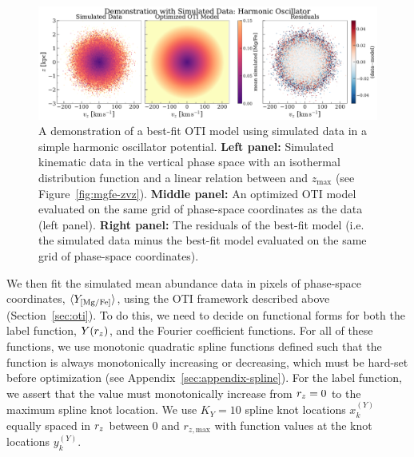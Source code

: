 \begin{figure}[t!]
\begin{center}
\includegraphics[width=\textwidth]{sho-data-model.pdf}
\end{center}
\caption{%
A demonstration of a best-fit OTI model using simulated data in a simple harmonic
oscillator potential.
\textbf{Left panel:} Simulated kinematic data in the vertical phase space with an
isothermal distribution function and a linear relation between  and
$z_{\textrm{max}}$ (see Figure~\ref{fig:mgfe-zvz}).
\textbf{Middle panel:} An optimized OTI model evaluated on the same grid of phase-space
coordinates as the data (left panel).
\textbf{Right panel:} The residuals of the best-fit model (i.e. the simulated data minus
the best-fit model evaluated on the same grid of phase-space coordinates).
\label{fig:sho-data-model}
}
\end{figure}

We then fit the simulated mean abundance data in pixels of phase-space coordinates,
$\langle Y_{{[\mathrm{Mg}/\mathrm{Fe}]}} \rangle$, using the OTI framework described above
(Section~\ref{sec:oti}).
To do this, we need to decide on functional forms for both the label function, $Y(r_z)$,
and the Fourier coefficient functions.
For all of these functions, we use monotonic quadratic spline functions defined such
that the function is always monotonically increasing or decreasing, which must be
hard-set before optimization (see Appendix~\ref{sec:appendix-spline}).
For the label function, we assert that the value must monotonically increase from $r_z =
0$ to the maximum spline knot location.
We use $K_Y=10$ spline knot locations $x_k^{(Y)}$ equally spaced in $r_z$ between $0$
and $r_{z, \textrm{max}}$ with function values at the knot locations $y_k^{(Y)}$.

